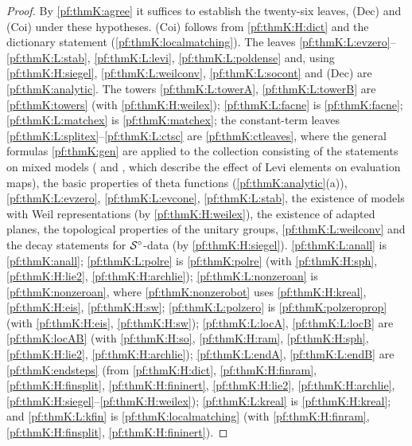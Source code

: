 \begin{proof}
By \cref{pf:thmK:agree} it suffices to establish the twenty-six leaves, \textup{(Dec)} and \textup{(Coi)} under these
hypotheses. \textup{(Coi)} follows from \ref{pf:thmK:H:dict} and the dictionary statement (\cref{pf:thmK:localmatching}). The
leaves \ref{pf:thmK:L:evzero}--\ref{pf:thmK:L:stab}, \ref{pf:thmK:L:levi}, \ref{pf:thmK:L:poldense} and, using
\ref{pf:thmK:H:siegel}, \ref{pf:thmK:L:weilconv}, \ref{pf:thmK:L:socont} and \textup{(Dec)} are \cref{pf:thmK:analytic}. The
towers \ref{pf:thmK:L:towerA}, \ref{pf:thmK:L:towerB} are \cref{pf:thmK:towers} (with \ref{pf:thmK:H:weilex});
\ref{pf:thmK:L:facne} is \cref{pf:thmK:facne}; \ref{pf:thmK:L:matchex} is \cref{pf:thmK:matchex}; the constant-term leaves
\ref{pf:thmK:L:splitex}--\ref{pf:thmK:L:ctsc} are \cref{pf:thmK:ctleaves}, where the general formulas \cref{pf:thmK:gen} are
applied to the collection consisting of the statements on mixed models ( and
, which describe the effect of Levi elements on evaluation maps), the basic
properties of theta functions (\cref{pf:thmK:analytic}(a)), \ref{pf:thmK:L:evzero}, \ref{pf:thmK:L:evcone},
\ref{pf:thmK:L:stab}, the existence of models with Weil representations (by \ref{pf:thmK:H:weilex}), the existence of adapted
planes, the topological properties of the unitary groups, \ref{pf:thmK:L:weilconv} and the decay statements for
$\mathcal{S}^{\circ}$-data (by \ref{pf:thmK:H:siegel}). \ref{pf:thmK:L:anall} is \cref{pf:thmK:anall}; \ref{pf:thmK:L:polre} is
\cref{pf:thmK:polre} (with \ref{pf:thmK:H:sph}, \ref{pf:thmK:H:lie2}, \ref{pf:thmK:H:archlie}); \ref{pf:thmK:L:nonzeroan} is
\cref{pf:thmK:nonzeroan}, where \cref{pf:thmK:nonzerobot} uses \ref{pf:thmK:H:kreal}, \ref{pf:thmK:H:eis},
\ref{pf:thmK:H:sw}; \ref{pf:thmK:L:polzero} is \cref{pf:thmK:polzeroprop} (with \ref{pf:thmK:H:eis}, \ref{pf:thmK:H:sw});
\ref{pf:thmK:L:locA}, \ref{pf:thmK:L:locB} are \cref{pf:thmK:locAB} (with \ref{pf:thmK:H:so}, \ref{pf:thmK:H:ram},
\ref{pf:thmK:H:sph}, \ref{pf:thmK:H:lie2}, \ref{pf:thmK:H:archlie}); \ref{pf:thmK:L:endA}, \ref{pf:thmK:L:endB} are
\cref{pf:thmK:endsteps} (from \ref{pf:thmK:H:dict},
\ref{pf:thmK:H:finram}, \ref{pf:thmK:H:finsplit}, \ref{pf:thmK:H:fininert}, \ref{pf:thmK:H:lie2}, \ref{pf:thmK:H:archlie},
\ref{pf:thmK:H:siegel}--\ref{pf:thmK:H:weilex}); \ref{pf:thmK:L:kreal} is \ref{pf:thmK:H:kreal}; and \ref{pf:thmK:L:kfin} is
\cref{pf:thmK:localmatching} (with \ref{pf:thmK:H:finram}, \ref{pf:thmK:H:finsplit}, \ref{pf:thmK:H:fininert}).
\end{proof}

